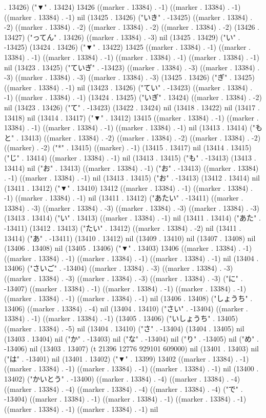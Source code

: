 . 13426) ("▼" . 13424) 13426 ((marker . 13384) . -1) ((marker . 13384) . -1) ((marker . 13384) . -1) nil (13425 . 13426) ("いき" . -13425) ((marker . 13384) . -2) ((marker . 13384) . -2) ((marker . 13384) . -2) ((marker . 13384) . -2) (13426 . 13427) ("ってん" . 13426) ((marker . 13384) . -3) nil (13425 . 13429) ("い" . -13425) (13424 . 13426) ("▼" . 13422) 13425 ((marker . 13384) . -1) ((marker . 13384) . -1) ((marker . 13384) . -1) ((marker . 13384) . -1) ((marker . 13384) . -1) nil (13423 . 13425) ("ていぎ" . -13423) ((marker . 13384) . -3) ((marker . 13384) . -3) ((marker . 13384) . -3) ((marker . 13384) . -3) (13425 . 13426) ("ぎ" . 13425) ((marker . 13384) . -1) nil (13423 . 13426) ("てい" . -13423) ((marker . 13384) . -1) ((marker . 13384) . -1) (13424 . 13425) ("いぎ" . 13424) ((marker . 13384) . -2) nil (13423 . 13426) ("て" . -13423) (13422 . 13424) nil (13418 . 13422) nil (13417 . 13418) nil (13414 . 13417) ("▼" . 13412) 13415 ((marker . 13384) . -1) ((marker . 13384) . -1) ((marker . 13384) . -1) ((marker . 13384) . -1) nil (13413 . 13414) ("もと" . 13413) ((marker . 13384) . -2) ((marker . 13384) . -2) ((marker . 13384) . -2) ((marker) . -2) ("*" . 13415) ((marker) . -1) (13415 . 13417) nil (13414 . 13415) ("じ" . 13414) ((marker . 13384) . -1) nil (13413 . 13415) ("も" . -13413) (13413 . 13414) nil ("お" . 13413) ((marker . 13384) . -1) ("お" . -13413) ((marker . 13384) . -1) ((marker . 13384) . -1) nil (13413 . 13415) ("お" . -13413) (13412 . 13414) nil (13411 . 13412) ("▼" . 13410) 13412 ((marker . 13384) . -1) ((marker . 13384) . -1) ((marker . 13384) . -1) nil (13411 . 13412) ("あたい" . -13411) ((marker . 13384) . -3) ((marker . 13384) . -3) ((marker . 13384) . -3) ((marker . 13384) . -3) (13413 . 13414) ("い" . 13413) ((marker . 13384) . -1) nil (13411 . 13414) ("あた" . -13411) (13412 . 13413) ("たい" . 13412) ((marker . 13384) . -2) nil (13411 . 13414) ("あ" . -13411) (13410 . 13412) nil (13409 . 13410) nil (13407 . 13408) nil (13406 . 13408) nil (13405 . 13406) ("▼" . 13403) 13406 ((marker . 13384) . -1) ((marker . 13384) . -1) ((marker . 13384) . -1) ((marker . 13384) . -1) nil (13404 . 13406) ("さいご" . -13404) ((marker . 13384) . -3) ((marker . 13384) . -3) ((marker . 13384) . -3) ((marker . 13384) . -3) ((marker . 13384) . -3) ("に" . -13407) ((marker . 13384) . -1) ((marker . 13384) . -1) ((marker . 13384) . -1) ((marker . 13384) . -1) ((marker . 13384) . -1) nil (13406 . 13408) ("しょうち" . 13406) ((marker . 13384) . -4) nil (13404 . 13410) ("さい" . -13404) ((marker . 13384) . -1) ((marker . 13384) . -1) (13405 . 13406) ("いしょうち" . 13405) ((marker . 13384) . -5) nil (13404 . 13410) ("さ" . -13404) (13404 . 13405) nil (13403 . 13404) nil ("か" . -13403) nil ("な" . -13404) nil ("り" . -13405) nil ("め" . -13406) nil (13403 . 13407) (t 21396 12776 929101 609000) nil (13401 . 13403) nil ("は" . -13401) nil (13401 . 13402) ("▼" . 13399) 13402 ((marker . 13384) . -1) ((marker . 13384) . -1) ((marker . 13384) . -1) ((marker . 13384) . -1) nil (13400 . 13402) ("かいとう" . -13400) ((marker . 13384) . -4) ((marker . 13384) . -4) ((marker . 13384) . -4) ((marker . 13384) . -4) ((marker . 13384) . -4) ("で" . -13404) ((marker . 13384) . -1) ((marker . 13384) . -1) ((marker . 13384) . -1) ((marker . 13384) . -1) ((marker . 13384) . -1) nil 